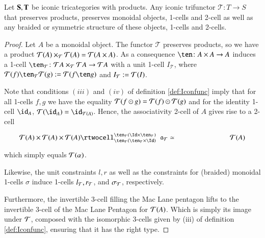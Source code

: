 \documentclass{amsart}
\begin{document}
  
 \begin{lem}
  Let ${\bf S,T}$ be iconic tricategories with products. Any iconic trifunctor $\mathcal{T}: T \rightarrow S$ that preserves products, preserves  monoidal objects, 1-cells and 2-cell as well as any braided or symmetric structure of these objects, 1-cells and 2-cells.
 \end{lem}
 
 \begin{proof}
Let $A$ be a monoidal object. The functor $\mathcal{T}$ preserves products, so we have a product $\mathcal{T}(A) \times_{\mathcal{T}} \mathcal{T}(A) = \mathcal{T}(A \times A)$. As a consequence $\ten\maps
  A\times A\to A$ induces a 1-cell $\ten_{\mathcal{T}} \maps
 \mathcal{T}A\times_{\cT} \mathcal{T} A\to\mathcal{T}A$ with a unit 1-cell $I_{\mathcal{T}}$, where $\cT(f) \ten_{\cT} \cT(g) := \cT(f \ten g)$ and $I_{\mathcal{T}}:= \mathcal{T}(I)$. 
 
 Note that conditions $(iii)$ and $(iv)$ of definition \ref{def:Iconfunc} imply that for all 1-cells $f,g$ we have the equality $\mathcal{T}(f \odot g) = \mathcal{T}(f) \odot \mathcal{T}(g)$ and for the identity 1-cell $\id_A$, $\cT(\id_A) = \id_{\cT(A)}$. Hence, the associativity 2-cell of $A$ gives rise to a 2-cell
  \[\vcenter{\xymatrix@C=6pc{\cT(A)\times\cT(A)\times\cT(A) \rtwocell^{\ten_{\cT}
        (\Id\times\ten_{\cT})}_{\ten_{\cT}(\ten_{\cT}\times\Id)}{\hspace{.2cm}\fa_{\cT}\eqv} &\cT(A) }}\]
  which simply equals $\mathcal{T}(\alpha)$.
  
  Likewise, the unit constraints $l, r$ as well as the constraints for (braided) monoidal 1-cells $\sigma$ induce 1-cells $l_{\mathcal{T}}, r_{\mathcal{T}}$, and $\sigma_{\mathcal{T}}$, respectively.
  
 Furthermore, the invertible 3-cell filling the Mac Lane pentagon lifts to the invertible 3-cell of the Mac Lane Pentagon for $\mathcal{T}(A)$. Which is simply its image under $\mathcal{T}$, composed with the isomorphic $3$-cells given by (iii) of definition \ref{def:Iconfunc}, ensuring that it has the right type.
  

\end{proof}
\end{document}

